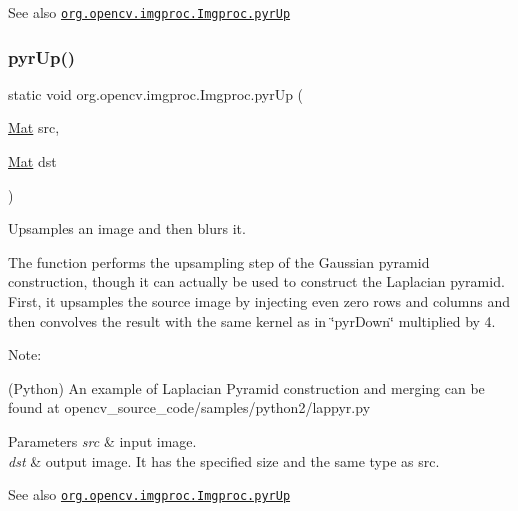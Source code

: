 \begin{DoxySeeAlso}{See also}
\href{http://docs.opencv.org/modules/imgproc/doc/filtering.html#pyrup}{\tt org.\+opencv.\+imgproc.\+Imgproc.\+pyr\+Up} 
\end{DoxySeeAlso}
\mbox{\label{classorg_1_1opencv_1_1imgproc_1_1_imgproc_abd25266f8f94c20c8112899d52de4af6}} 
\subsubsection{\texorpdfstring{pyr\+Up()}{pyrUp()}\hspace{0.1cm}{\footnotesize\ttfamily [3/3]}}
{\footnotesize\ttfamily static void org.\+opencv.\+imgproc.\+Imgproc.\+pyr\+Up (\begin{DoxyParamCaption}\item[{\mbox{\hyperlink{classorg_1_1opencv_1_1core_1_1_mat}{Mat}}}]{src,  }\item[{\mbox{\hyperlink{classorg_1_1opencv_1_1core_1_1_mat}{Mat}}}]{dst }\end{DoxyParamCaption})\hspace{0.3cm}{\ttfamily [static]}}

Upsamples an image and then blurs it.

The function performs the upsampling step of the Gaussian pyramid construction, though it can actually be used to construct the Laplacian pyramid. First, it upsamples the source image by injecting even zero rows and columns and then convolves the result with the same kernel as in \char`\"{}pyr\+Down\char`\"{} multiplied by 4.

Note\+:


\begin{DoxyItemize}
\item (Python) An example of Laplacian Pyramid construction and merging can be found at opencv\+\_\+source\+\_\+code/samples/python2/lappyr.\+py 
\end{DoxyItemize}


\begin{DoxyParams}{Parameters}
{\em src} & input image. \\
\hline
{\em dst} & output image. It has the specified size and the same type as {\ttfamily src}.\\
\hline
\end{DoxyParams}
\begin{DoxySeeAlso}{See also}
\href{http://docs.opencv.org/modules/imgproc/doc/filtering.html#pyrup}{\tt org.\+opencv.\+imgproc.\+Imgproc.\+pyr\+Up} 
\end{DoxySeeAlso}
\mbox{\label{classorg_1_1opencv_1_1imgproc_1_1_imgproc_a8a8e3511105ae0f5fbd525e31ad7672c}} 
